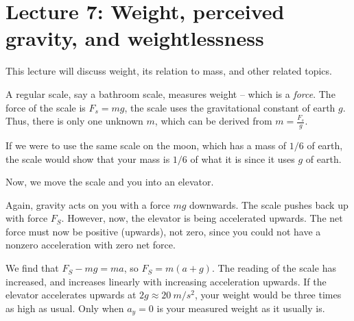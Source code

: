 
\section{Lecture 7: Weight, perceived gravity, and weightlessness}

This lecture will discuss weight, its relation to mass, and other related topics.

A regular scale, say a bathroom scale, measures weight -- which is a \emph{force}.
The force of the scale is $F_s=mg$, the scale uses the gravitational constant of earth $g$.
Thus, there is only one unknown $m$, which can be derived from $m=\frac{F_s}{g}$.

If we were to use the same scale on the moon, which has a mass of $1/6$ of earth, the 
scale would show that your mass is $1/6$ of what it is since it uses $g$ of earth.

Now, we move the scale and you into an elevator.

\begin{figure}[H]
  \centering
{}
\end{figure}

Again, gravity acts on you with a force $m g$ downwards. The scale pushes back up with force $F_S$. However, now, the elevator is being accelerated upwards. The net force must now be positive (upwards), not zero, since you could not have a nonzero acceleration with zero net force.

We find that $F_S - m g = m a$, so $F_S = m(a + g)$. The reading of the scale has increased, and increases linearly with increasing acceleration upwards. If the elevator accelerates upwards at $2g \approx \SI{20}{m/s^2}$, your weight would be three times as high as usual. Only when $a_y = 0$ is your measured weight as it usually is.

